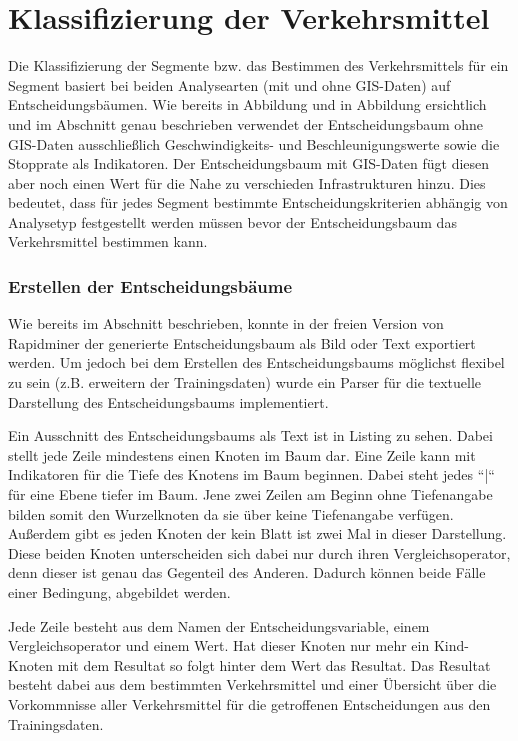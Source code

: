 \section{Klassifizierung der Verkehrsmittel}
Die Klassifizierung der Segmente bzw. das Bestimmen des Verkehrsmittels für ein Segment basiert bei beiden Analysearten (mit und ohne GIS-Daten) auf Entscheidungsbäumen. Wie bereits in Abbildung  und in Abbildung  ersichtlich und im Abschnitt  genau beschrieben verwendet der Entscheidungsbaum ohne GIS-Daten ausschließlich Geschwindigkeits- und Beschleunigungswerte sowie die Stopprate als Indikatoren. Der Entscheidungsbaum mit GIS-Daten fügt diesen aber noch einen Wert für die Nahe zu verschieden Infrastrukturen hinzu. Dies bedeutet, dass für jedes Segment bestimmte Entscheidungskriterien abhängig von Analysetyp festgestellt werden müssen bevor der Entscheidungsbaum das Verkehrsmittel bestimmen kann. 

\subsubsection{Erstellen der Entscheidungsbäume}
\label{entscheidungsbaumGenerierungPHP}
Wie bereits im Abschnitt  beschrieben, konnte in der freien Version von Rapidminer der generierte Entscheidungsbaum als Bild oder Text exportiert werden. Um jedoch bei dem Erstellen des Entscheidungsbaums möglichst flexibel zu sein (z.B. erweitern der Trainingsdaten) wurde ein Parser für die textuelle Darstellung des Entscheidungsbaums implementiert. 

Ein Ausschnitt des Entscheidungsbaums als Text ist in Listing  zu sehen. Dabei stellt jede Zeile mindestens einen Knoten im Baum dar. Eine Zeile kann mit Indikatoren für die Tiefe des Knotens im Baum beginnen. Dabei steht jedes ``|`` für eine Ebene tiefer im Baum. Jene zwei Zeilen am Beginn ohne Tiefenangabe bilden somit den Wurzelknoten da sie über keine Tiefenangabe verfügen. Außerdem gibt es jeden Knoten der kein Blatt ist zwei Mal in dieser Darstellung. Diese beiden Knoten unterscheiden sich dabei nur durch ihren Vergleichsoperator, denn dieser ist genau das Gegenteil des Anderen. Dadurch können beide Fälle einer Bedingung, abgebildet werden.

Jede Zeile besteht aus dem Namen der Entscheidungsvariable, einem Vergleichsoperator und einem Wert. Hat dieser Knoten nur mehr ein Kind-Knoten mit dem Resultat so folgt hinter dem Wert das Resultat. Das Resultat besteht dabei aus dem bestimmten Verkehrsmittel und einer Übersicht über die Vorkommnisse aller Verkehrsmittel für die getroffenen Entscheidungen aus den Trainingsdaten.

